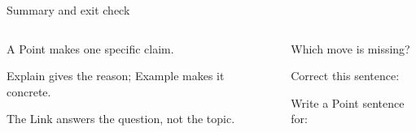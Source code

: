 
\begin{frame}[stage=Wrap-up]{Summary and exit check}
  \begin{columns}[T,onlytextwidth]
      \begin{summary}
        \item A Point makes one specific claim.
        \item Explain gives the reason; Example makes it concrete.
        \item The Link answers the question, not the topic.
      \end{summary}
      \begin{wordlist}
      \end{wordlist}
      \begin{exitcheck}
        \item Which move is missing?
        \item Correct this sentence: 
        \item Write a Point sentence for: 
      \end{exitcheck}
  \end{columns}
\end{frame}


